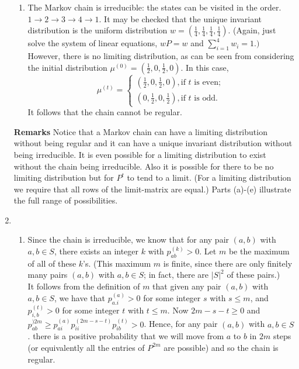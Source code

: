\documentclass[11pt,a4paper]{article}
\begin{document}
\begin{enumerate}
\begin{enumerate}
            \item The Markov chain is irreducible: the states can be visited in the order. $1\to 2 \to 3 \to 4 \to 1$. It may be checked that the unique invariant distribution is the uniform distribution $w = (\frac{1}{4}, \frac{1}{4},\frac{1}{4},\frac{1}{4})$. (Again, just solve the system of linear equations, $wP = w$ and $\sum_{i=1}^4w_i = 1.)$ However, there is no limiting distribution, as can be seen from considering the initial distribution $\mu^{(0)}=(\frac{1}{2},0,\frac{1}{2},0)$. In this case,
            $$
            \mu^{(t)}
            =
            \begin{cases}
                (\frac{1}{2},0,\frac{1}{2},0), \text{if $t$ is even};\\
                (0,\frac{1}{2},0,\frac{1}{2}), \text{if $t$ is odd}.
            \end{cases}
            $$
            It follows that the chain cannot be regular.
        \end{enumerate}
        \textbf{Remarks} Notice that a Markov chain can have a limiting distribution without being regular and it can have a unique invariant distribution without being irreducible. It is even possible for a limiting distribution to exist without the chain being irreducible. Also it is possible for there to be no limiting distribution but for $P^t$ to tend to a limit. (For a limiting distribution we require that all rows of the limit-matrix are equal.) Parts (a)-(e) illustrate the full range of possibilities.
        \item 
        \begin{enumerate}
            \item Since the chain is irreducible, we know that for any pair $(a,b)$ with $a,b \in S$,  there exists an integer $k$ with $p_{ab}^{(k)}>0$. Let $m$ be the maximum of all of these $k$'s. (This maximum $m$ is finite, since there are only finitely many pairs $(a,b)$ with $a,b \in S$; in fact, there are $|S|^2$ of these pairs.)\\
            It follows from the definition of $m$ that given any pair $(a,b)$ with $a,b \in S$, we have that $p_{a.i}^{(a)}>0$ for some integer $s$ with $s \leq m$, and $p_{i,b}^{(t)}>0$ for some integer $t$ with $t \leq m$. Now $2m-s-t \geq 0$ and $p_{ab}^{)2m} \geq p_{ai}^{(a)}p_{ii}^{(2m-s-t)}p_{ib}^{(t)}>0$. Hence, for any pair $(a,b)$ with $a,b \in S$. there is a positive probability that we will move from $a$ to $b$ in $2m$ steps (or equivalently all the entries of $P^{2m}$ are possible) and so the chain is regular.

\end{enumerate}
\end{enumerate}
\end{document}
